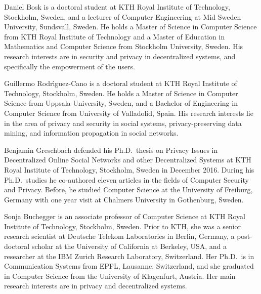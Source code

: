 
Daniel Bosk is a doctoral student at KTH Royal Institute of Technology, 
Stockholm, Sweden, and a lecturer of Computer Engineering at Mid Sweden 
University, Sundsvall, Sweden.
He holds a Master of Science in Computer Science from KTH Royal Institute of 
Technology and a Master of Education in Mathematics and Computer Science from 
Stockholm University, Sweden.
His research interests are in security and privacy in decentralized systems, 
and specifically the empowerment of the users.

Guillermo Rodr\'{\i}guez-Cano is a doctoral student at KTH Royal Institute of 
Technology, Stockholm, Sweden.
He holds a Master of Science in Computer Science from Uppsala University, 
Sweden, and a Bachelor of Engineering in Computer Science from University of 
Valladolid, Spain.
His research interests lie in the area of privacy and security in social 
systems, privacy-preserving data mining, and information propagation in 
social networks.

Benjamin Greschbach defended his Ph.D.\ thesis on Privacy Issues in Decentralized 
Online Social Networks and other Decentralized Systems at KTH Royal Institute 
of Technology, Stockholm, Sweden in December 2016. During his Ph.D.\ studies he 
co-authored eleven articles in the fields of Computer Security and Privacy. 
Before, he studied Computer Science at the University of Freiburg, Germany 
with one year visit at Chalmers University in Gothenburg, Sweden.

Sonja Buchegger is an associate professor of Computer Science at KTH Royal 
Institute of Technology, Stockholm, Sweden.
Prior to KTH, she was a
senior research scientist at Deutsche Telekom Laboratories in Berlin, Germany,
a post-doctoral scholar at the University of California at Berkeley, USA, 
and a researcher at the IBM Zurich Research Laboratory, Switzerland.
Her Ph.D.\ is in Communication Systems from EPFL, Lausanne, Switzerland, and 
she graduated in Computer Science from the University of Klagenfurt, Austria.
Her main research interests are in privacy and decentralized systems.
